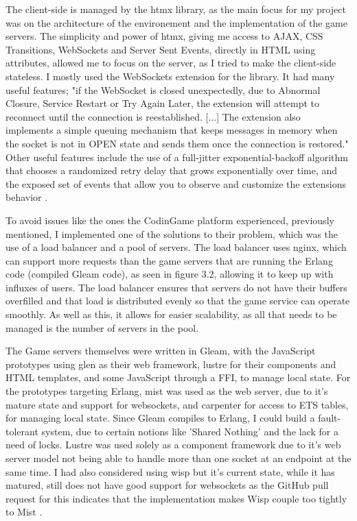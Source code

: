 \documentclass[]{interim}
\begin{document}
The client-side is managed by the htmx library, as the main focus for my project
was on the architecture of the environement and the implementation of the game
servers. The simplicity and power of htmx, giving me access to AJAX, CSS Transitions,
WebSockets and Server Sent Events, directly in HTML using attributes,\cite{noauthor_htmx_nodate} allowed me to
focus on the server, as I tried to make the client-side stateless. I mostly
used the WebSockets extension for the library. It had many useful features;
"if the WebSocket is closed unexpectedly, due to Abnormal Closure, Service Restart
or Try Again Later, the extension will attempt to reconnect until the connection
is reestablished. [...] The extension also implements a simple queuing mechanism that
keeps messages in memory when the socket is not in OPEN state and sends
them once the connection is restored."\cite{noauthor_htmx_ws_nodate} Other useful features include the
use of a full-jitter exponential-backoff algorithm that chooses a randomized
retry delay that grows exponentially over time, and the exposed
set of events that allow you to observe and customize the extensions behavior
\cite{noauthor_htmx_ws_nodate}.

To avoid issues like the ones the CodinGame platform
experienced, previously mentioned, I implemented one of the
solutions to their problem, which was the use of a load balancer and a pool
of servers\cite{jobert_story_2017}. The load balancer uses nginx, which can
support more requests
than the game servers that are running the Erlang code (compiled Gleam code),
as seen in figure 3.2, allowing it to keep up with influxes of users.
The load balancer ensures that servers do not have their buffers overfilled
and that load is distributed evenly so that the game service can operate smoothly.
As well as this, it allows for easier scalability, as all that needs to be managed is the
number of servers in the pool.

The Game servers themselves were written in Gleam, with the JavaScript prototypes
using glen as their web framework, lustre for their components and HTML templates,
and some JavaScript through a FFI, to manage local state. For the prototypes
targeting Erlang, mist was used as the web server, due to it's mature state
and support for websockets, and carpenter for access to ETS tables, for managing
local state. Since Gleam compiles to Erlang, I could build a fault-tolerant
system, due to certain notions like 'Shared Nothing' and the lack for a need
of locks. Lustre was used solely as a component framework due to it's web server model
not being able to handle more than one socket at an endpoint at the same time.
I had also considered using wisp but it's current state, while it has matured, still
does not have good support for websockets as the GitHub pull request for this indicates
that the implementation makes Wisp couple too tightly to Mist \cite{noauthor_websockets_nodate}.
\end{document}
